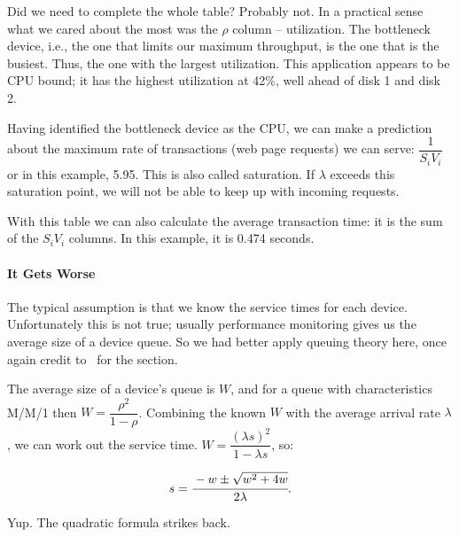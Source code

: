 \documentclass[a4paper]{report}
\begin{document}
Did we need to complete the whole table? Probably not. In a practical sense what we cared about the most was the $\rho$ column -- utilization. The bottleneck device, i.e., the one that limits our maximum throughput, is the one that is the busiest. Thus, the one with the largest utilization. This application appears to be CPU bound; it has the highest utilization at 42\%, well ahead of disk 1 and disk 2. 

Having identified the bottleneck device as the CPU, we can make a prediction about the maximum rate of transactions (web page requests) we can serve: $\dfrac{1}{S_{i}V_{i}}$ or in this example, 5.95. This is also called saturation. If $\lambda$ exceeds this saturation point, we will not be able to keep up with incoming requests.

With this table we can also calculate the average transaction time: it is the sum of the $S_{i}V_{i}$ columns. In this example, it is 0.474 seconds. 

\paragraph*{It Gets Worse}

The typical assumption is that we know the service times for each device. Unfortunately this is not true; usually performance monitoring gives us the average size of a device queue. So we had better apply queuing theory here, once again credit to~\cite{williams-calc} for the section. 

The average size of a device's queue is $W$, and for a queue with characteristics M/M/1 then $W = \dfrac{\rho^{2}}{1-\rho}$. Combining the known $W$ with the average arrival rate $\lambda$, we can work out the service time. $W = \dfrac{(\lambda s)^{2}}{1 - \lambda s}$, so:

\[ s = \cfrac{-w \pm \sqrt{w^{2}+4w}}{2\lambda}.\]

Yup. The quadratic formula strikes back. 








\newcommand{\FPP}{FastPass\nolinebreak\hspace{-.05em}\raisebox{.4ex}{\tiny\bf +}\nolinebreak\hspace{-.10em}\raisebox{.4ex}{\tiny\bf +}}
\def\FPP{{FastPass\nolinebreak[4]\hspace{-.05em}\raisebox{.4ex}{\tiny\bf ++}}}
\end{document}
